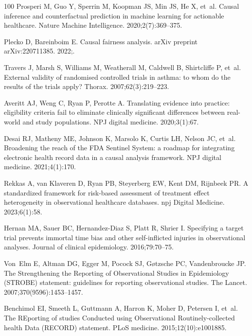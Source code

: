 \documentclass[10pt,letterpaper]{article}
\begin{document}
\begin{thebibliography}{100}
  Prosperi M, Guo Y, Sperrin M, Koopman JS, Min JS, He X, et~al.
  \newblock Causal inference and counterfactual prediction in machine learning for actionable healthcare.
  \newblock Nature Machine Intelligence. 2020;2(7):369--375.

  Plecko D, Bareinboim E.
  \newblock Causal fairness analysis.
  \newblock arXiv preprint arXiv:220711385. 2022;.

  Travers J, Marsh S, Williams M, Weatherall M, Caldwell B, Shirtcliffe P, et~al.
  \newblock External validity of randomised controlled trials in asthma: to whom do the results of the trials apply?
  \newblock Thorax. 2007;62(3):219--223.

  Averitt AJ, Weng C, Ryan P, Perotte A.
  \newblock Translating evidence into practice: eligibility criteria fail to eliminate clinically significant differences between real-world and study populations.
  \newblock NPJ digital medicine. 2020;3(1):67.

  Desai RJ, Matheny ME, Johnson K, Marsolo K, Curtis LH, Nelson JC, et~al.
  \newblock Broadening the reach of the FDA Sentinel System: a roadmap for integrating electronic health record data in a causal analysis framework.
  \newblock NPJ digital medicine. 2021;4(1):170.

  Rekkas A, van Klaveren D, Ryan PB, Steyerberg EW, Kent DM, Rijnbeek PR.
  \newblock A standardized framework for risk-based assessment of treatment effect heterogeneity in observational healthcare databases.
  \newblock npj Digital Medicine. 2023;6(1):58.

  Hernan MA, Sauer BC, Hernandez-Diaz S, Platt R, Shrier I.
  \newblock Specifying a target trial prevents immortal time bias and other self-inflicted injuries in observational analyses.
  \newblock Journal of clinical epidemiology. 2016;79:70--75.

  Von~Elm E, Altman DG, Egger M, Pocock SJ, G{\o}tzsche PC, Vandenbroucke JP.
  \newblock The Strengthening the Reporting of Observational Studies in Epidemiology (STROBE) statement: guidelines for reporting observational studies.
  \newblock The Lancet. 2007;370(9596):1453--1457.

  Benchimol EI, Smeeth L, Guttmann A, Harron K, Moher D, Petersen I, et~al.
  \newblock The REporting of studies Conducted using Observational Routinely-collected health Data (RECORD) statement.
  \newblock PLoS medicine. 2015;12(10):e1001885.


\end{thebibliography}
\end{document}
